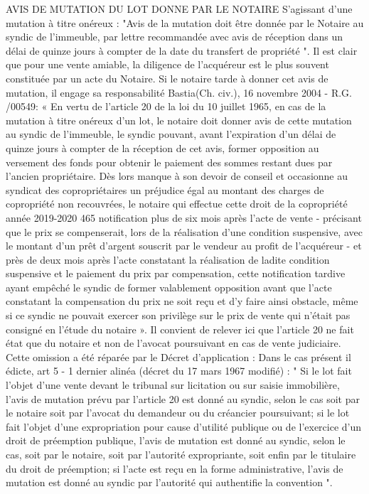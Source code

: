 AVIS DE MUTATION DU LOT DONNE PAR LE NOTAIRE
S'agissant d'une mutation à titre onéreux :
"Avis de la mutation doit être donnée par le Notaire au syndic de l'immeuble, par lettre recommandée avec avis de réception dans un délai de quinze jours à compter de la date du transfert de propriété ".
Il est clair que pour une vente amiable, la diligence de l'acquéreur est le plus souvent constituée par un acte du Notaire.
Si le notaire tarde à donner cet avis de mutation, il engage sa responsabilité
Bastia(Ch. civ.), 16 novembre 2004 - R.G. /00549:
« En vertu de l'article 20 de la loi du 10 juillet 1965, en cas de la mutation à titre onéreux d'un lot, le notaire doit donner avis de cette mutation au syndic de l'immeuble, le syndic pouvant, avant l'expiration d'un délai de quinze jours à compter de la réception de cet avis, former opposition au versement des fonds pour obtenir le paiement des sommes restant dues par l'ancien propriétaire.
Dès lors manque à son devoir de conseil et occasionne au syndicat des copropriétaires un préjudice égal au montant des charges de copropriété non recouvrées, le notaire qui effectue cette
droit de la copropriété année 2019-2020
465
notification plus de six mois après l'acte de vente - précisant que le prix se compenserait, lors de la réalisation d'une condition suspensive, avec le montant d'un prêt d'argent souscrit par le vendeur au profit de l'acquéreur - et près de deux mois après l'acte constatant la réalisation de ladite condition suspensive et le paiement du prix par compensation, cette notification tardive ayant empêché le syndic de former valablement opposition avant que l'acte constatant la compensation du prix ne soit reçu et d'y faire ainsi obstacle, même si ce syndic ne pouvait exercer son privilège sur le prix de vente qui n'était pas consigné en l'étude du notaire ».
Il convient de relever ici que l’article 20 ne fait état que du notaire et non de l’avocat poursuivant en cas de vente judiciaire. Cette omission a été réparée par le Décret d’application :
Dans le cas présent il édicte, art 5 - 1 dernier alinéa (décret du 17 mars 1967 modifié) :
" Si le lot fait l'objet d'une vente devant le tribunal sur licitation ou sur saisie immobilière, l'avis de mutation prévu par l'article 20 est donné au syndic, selon le cas soit par le notaire soit par l'avocat du demandeur ou du créancier poursuivant; si le lot fait l'objet d'une expropriation pour cause d'utilité publique ou de l'exercice d'un droit de préemption publique, l'avis de mutation est donné au syndic, selon le cas, soit par le notaire, soit par l'autorité expropriante, soit enfin par le titulaire du droit de préemption; si l'acte est reçu en la forme administrative, l'avis de mutation est donné au syndic par l'autorité qui authentifie la convention ".
